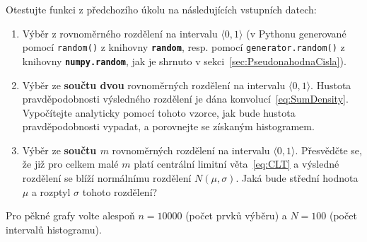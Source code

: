 \documentclass[a4paper,11pt,twoside]{article}
\def\code#1{\textnormal{\texttt{#1}}}
\def\file#1{\textnormal{\textbf{\texttt{#1}}}}
\theoremstyle{red}
\theoremstyle{green}
\begin{document}
    \begin{solved}\label{task:Distributions}
        Otestujte funkci z předchozího úkolu na následujících vstupních datech:
        \begin{enumerate}
            \item
                Výběr z rovnoměrného rozdělení na intervalu $\langle 0,1\rangle$ (v Pythonu generované pomocí \code{random()} z knihovny \file{random}, resp. pomocí \code{generator.random()} z knihovny \file{numpy.random}, jak je shrnuto v sekci~\ref{sec:PseudonahodnaCisla}).
            \item
                Výběr ze {\bf součtu dvou} rovnoměrných rozdělení na intervalu $\langle 0,1\rangle$.
                Hustota pravděpodobnosti výsledného rozdělení je dána konvolucí~\eqref{eq:SumDensity}.
                Vypočítejte analyticky pomocí tohoto vzorce, jak bude hustota pravděpodobnosti vypadat, a porovnejte se získaným histogramem.
            \item
                Výběr ze {\bf součtu $m$} rovnoměrných rozdělení na intervalu $\langle 0,1\rangle$.
                Přesvědčte se, že již pro celkem malé $m$ platí centrální limitní věta~\eqref{eq:CLT} a výsledné rozdělení se blíží normálnímu rozdělení $N(\mu,\sigma)$.
                Jaká bude střední hodnota $\mu$ a rozptyl $\sigma$ tohoto rozdělení?
        \end{enumerate}
        Pro pěkné grafy volte alespoň $n=10000$ (počet prvků výběru) a $N=100$ (počet intervalů histogramu).
    \end{solved}
    
\end{document}
